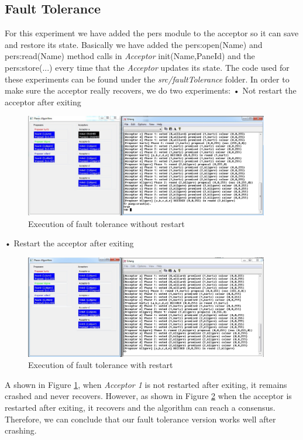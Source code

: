 \subsection{Fault Tolerance}
For this experiment we have added the pers module to the acceptor so it can save
and restore its state. Basically we have added the pers:open(Name) and pers:read(Name) 
method calls in \textit{Acceptor} init(Name,PaneId) and the pers:store(...) every
time that the \textit{Acceptor} updates its state. The code used for these experiments
can be found under the \textit{src/faultTolerance} folder.
In order to make sure the acceptor really recovers, we do two experiments:\newline
• Not restart the acceptor after exiting\newline
\begin{figure}[h!]
  \centering
    \includegraphics[width=0.95\textwidth]{./3_Experiments/images/faulttolerance1.jpg}
    \caption{Execution of fault tolerance without restart \label{fig:faulttolerance1}}
\end{figure}
• Restart the acceptor after exiting\newline
\begin{figure}[h!]
  \centering
    \includegraphics[width=0.95\textwidth]{./3_Experiments/images/faulttolerance2.jpg}
    \caption{Execution of fault tolerance with restart \label{fig:faulttolerance2}}
\end{figure}

A shown in Figure \ref{fig:faulttolerance1}, when \textit{Acceptor 1} is not restarted 
after exiting, it remains crashed and never recovers. However, as shown in Figure
\ref{fig:faulttolerance2} when the acceptor is restarted after exiting, it recovers
and the algorithm can reach a consensus. Therefore, we can conclude that our fault
tolerance version works well after crashing.

